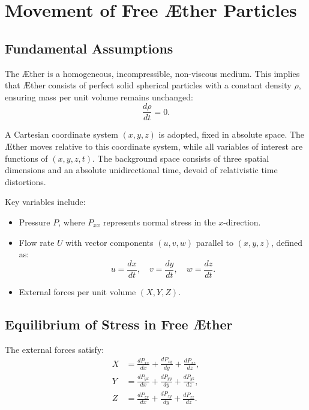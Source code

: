 

    \section{Movement of Free Æther Particles}

    \subsection*{Fundamental Assumptions}
    The Æther is a homogeneous, incompressible, non-viscous medium. This implies that Æther consists of perfect solid spherical particles with a constant density $\rho$, ensuring mass per unit volume remains unchanged:
    \begin{equation*}
        \frac{d \rho}{d t} = 0.
    \end{equation*}

    A Cartesian coordinate system $(x, y, z)$ is adopted, fixed in absolute space. The Æther moves relative to this coordinate system, while all variables of interest are functions of $(x, y, z, t)$. The background space consists of three spatial dimensions and an absolute unidirectional time, devoid of relativistic time distortions.

    Key variables include:
    \begin{itemize}
        \item Pressure $P$, where $P_{xx}$ represents normal stress in the $x$-direction.
        \item Flow rate $U$ with vector components $(u, v, w)$ parallel to $(x, y, z)$, defined as:
        \begin{equation*}
            u = \frac{dx}{dt}, \quad v = \frac{dy}{dt}, \quad w = \frac{dz}{dt}.
        \end{equation*}
        \item External forces per unit volume $(X, Y, Z)$.
    \end{itemize}

    \subsection*{Equilibrium of Stress in Free Æther}
    The external forces satisfy:
    \begin{align}
        X &= \frac{d P_{xx}}{dx} + \frac{d P_{xy}}{dy} + \frac{d P_{xz}}{dz}, \\
        Y &= \frac{d P_{yx}}{dx} + \frac{d P_{yy}}{dy} + \frac{d P_{yz}}{dz}, \\
        Z &= \frac{d P_{zx}}{dx} + \frac{d P_{zy}}{dy} + \frac{d P_{zz}}{dz}.
    \end{align}

